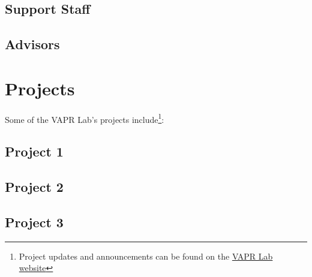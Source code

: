 \documentclass[12pt,]{memoir}
\let\rmarkdownfootnote\footnote%
\def\footnote{\protect\rmarkdownfootnote}
\begin{document}
\hypertarget{support-staff}{%
\section{Support Staff}\label{support-staff}}

\hypertarget{advisors}{%
\section{Advisors}\label{advisors}}

\hypertarget{projects}{%
\chapter{Projects}\label{projects}}

Some of the VAPR Lab's projects include\footnote{Project updates and announcements can be found on the \href{https://VAPR-Lab.github.io/website/}{VAPR Lab website}}:

\hypertarget{project-1}{%
\section{Project 1}\label{project-1}}

\hypertarget{project-2}{%
\section{Project 2}\label{project-2}}

\hypertarget{project-3}{%
\section{Project 3}\label{project-3}}


\end{document}
